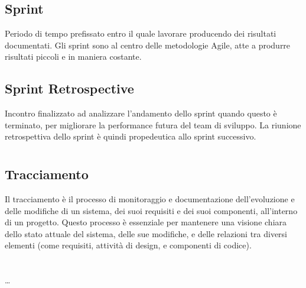 \subsection*{Sprint}
Periodo di tempo prefissato entro il quale lavorare producendo dei risultati documentati. Gli sprint sono al centro delle metodologie Agile, atte a produrre 
risultati piccoli e in maniera costante.

\subsection*{Sprint Retrospective}
Incontro finalizzato ad analizzare l’andamento dello sprint quando questo è terminato, per migliorare la performance futura del team di sviluppo. La 
riunione retrospettiva dello sprint è quindi propedeutica allo sprint successivo.

\newpage



\section{}

\subsection*{Tracciamento}
Il tracciamento è il processo di monitoraggio e documentazione dell'evoluzione e delle modifiche di un sistema, dei suoi requisiti e dei suoi componenti, 
all’interno di un progetto. Questo processo è essenziale per mantenere una visione chiara dello stato attuale del sistema, delle sue modifiche, e delle 
relazioni tra diversi elementi (come requisiti, attività di design, e componenti di codice).

\newpage



\section{}

\dots

\newpage



\section{}

